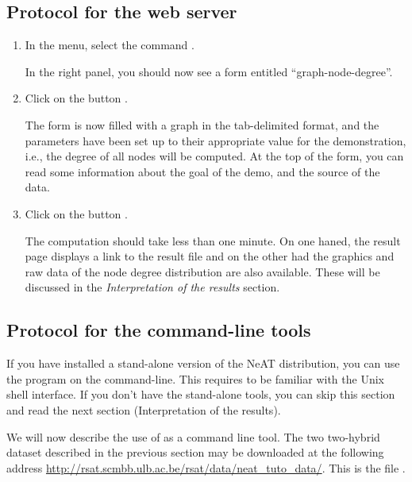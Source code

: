 \subsection{Protocol for the web server}

\begin{enumerate}

\item In the \neat menu, select the command . 

  In the right panel, you should now see a form entitled
  ``graph-node-degree''.

\item Click on the button . 

  The form is now filled with a graph in the tab-delimited format, and the parameters have been
  set up to their appropriate value for the demonstration, i.e., the degree of all nodes will be computed. 
  At the top of the form, you can read some information about the goal of the
  demo, and the source of the data.

\item Click on the button . 

  The computation should take less than one minute. On one haned, the result page
  displays a link to the result file and on the other had the graphics and raw data of the node degree distribution are also available. These will be discussed in the \textit{Interpretation of the results} section.

\end{enumerate}

\subsection{Protocol for the command-line tools}

If you have installed a stand-alone version of the NeAT distribution,
you can use the program  on the
command-line. This requires to be familiar with the Unix shell
interface. If you don't have the stand-alone tools, you can skip this
section and read the next section (Interpretation of the results).

We will now describe the use of  as a command line tool. 
The two two-hybrid dataset described
in the previous section may be downloaded at the following address \url{http://rsat.scmbb.ulb.ac.be/rsat/data/neat\_tuto\_data/}. 
This is the file .

